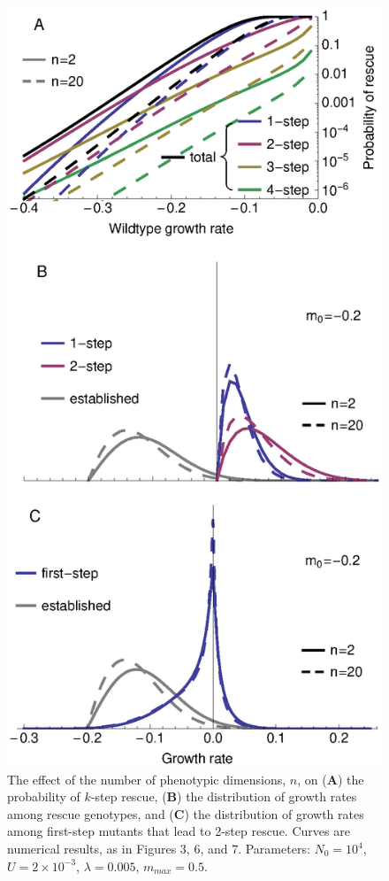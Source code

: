 \documentclass[9pt,twocolumn,twoside]{../main/gsajnl}
\begin{document}
\begin{figure}[htbp]
\centering
\includegraphics[width=\linewidth]{FigureS6.eps}
\caption{
The effect of the number of phenotypic dimensions, $n$, on (\textbf{A}) the probability of $k$-step rescue, (\textbf{B}) the distribution of growth rates among rescue genotypes, and (\textbf{C}) the distribution of growth rates among first-step mutants that lead to 2-step rescue.
Curves are numerical results, as in Figures 3, 6, and 7.
Parameters: $N_0=10^4$, $U=2\times 10^{-3}$, $\lambda=0.005$, $m_{max}=0.5$.
}%
\label{fig:dimension}
\end{figure}
\end{document}
